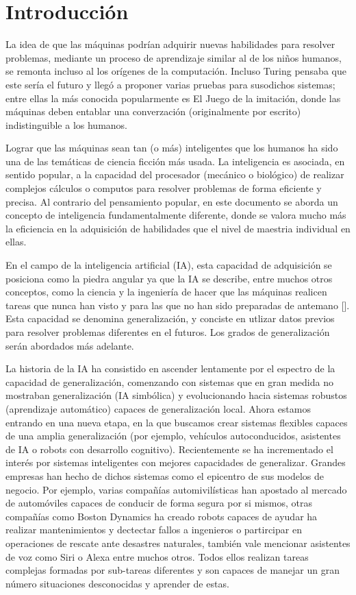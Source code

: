 \chapter*{Introducción}\label{chapter:introduction}


La idea de que las máquinas podrían adquirir nuevas habilidades para resolver problemas, mediante un proceso de aprendizaje similar al de los niños humanos, se remonta incluso al los orígenes de la computación. Incluso Turing pensaba que este sería el futuro y llegó a proponer varias pruebas para susodichos sistemas; entre ellas la más conocida popularmente es El Juego de la imitación, donde las máquinas deben entablar una converzación (originalmente por escrito) indistinguible a los humanos.

Lograr que las máquinas sean tan (o más) inteligentes que los humanos ha sido una de las temáticas de ciencia ficción más usada. La inteligencia es asociada, en sentido popular, a la capacidad del procesador (mecánico o biológico) de realizar complejos cálculos o computos para resolver problemas de forma eficiente y precisa. Al contrario del pensamiento popular, en este documento se aborda un concepto de inteligencia fundamentalmente diferente, donde se valora mucho más la eficiencia en la adquisición de habilidades que el nivel de maestria individual en ellas.

En el campo de la inteligencia artificial (IA), esta capacidad de adquisición se posiciona como la piedra angular ya que la IA se describe, entre muchos otros conceptos, como la ciencia y la ingeniería de hacer que las máquinas realicen tareas que nunca han visto y para las que no han sido preparadas de antemano [\cite{mccarthy1987generality}]. Esta capacidad se denomina generalización, y conciste en utlizar datos previos para resolver problemas diferentes en el futuros. Los grados de generalización serán abordados más adelante.


La historia de la IA ha consistido en ascender lentamente por el espectro de la capacidad de generalización, comenzando con sistemas que en gran medida no mostraban generalización (IA simbólica) y evolucionando hacia sistemas robustos (aprendizaje automático) capaces de generalización local. Ahora estamos entrando en una nueva etapa, en la que buscamos crear sistemas flexibles capaces de una amplia generalización (por ejemplo, vehículos autoconducidos, asistentes de IA o robots con desarrollo cognitivo). Recientemente se ha incrementado el interés por sistemas inteligentes con mejores capacidades de generalizar. Grandes empresas han hecho de dichos sistemas como el epicentro de sus modelos de negocio. Por ejemplo, varias compañías automivilísticas han apostado al mercado de automóviles capaces de conducir de forma segura por si mismos, otras compañías como Boston Dynamics ha creado robots capaces de ayudar ha realizar mantenimientos y dectectar fallos a ingenieros o partircipar en operaciones de rescate ante desastres naturales, también vale mencionar asistentes de voz como Siri o Alexa entre muchos otros. Todos ellos realizan tareas complejas formadas por sub-tareas diferentes y son capaces de manejar un gran número situaciones desconocidas y aprender de estas.

